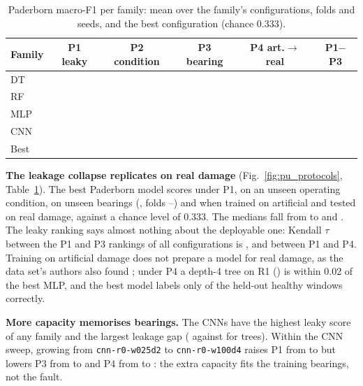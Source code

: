 \begin{table}[t]
\centering
\caption{Paderborn macro-F1 per family: mean over the family's configurations, folds and seeds, and the best
configuration (chance 0.333).}
\label{tab:pu}
\setlength{\tabcolsep}{4pt}
\begin{tabular}{lccccc}
\toprule
Family & P1 leaky & P2 condition & P3 bearing & P4 art.$\to$real & P1$-$P3 \\
\midrule
DT  & \NumPuMeanDtPOne{}  & \NumPuMeanDtPTwo{}  & \NumPuMeanDtPThree{}  & \NumPuMeanDtPFour{}  & \NumPuGapDt{} \\
RF  & \NumPuMeanRfPOne{}  & \NumPuMeanRfPTwo{}  & \NumPuMeanRfPThree{}  & \NumPuMeanRfPFour{}  & \NumPuGapRf{} \\
MLP & \NumPuMeanMlpPOne{} & \NumPuMeanMlpPTwo{} & \NumPuMeanMlpPThree{} & \NumPuMeanMlpPFour{} & \NumPuGapMlp{} \\
CNN & \NumPuMeanCnnPOne{} & \NumPuMeanCnnPTwo{} & \NumPuMeanCnnPThree{} & \NumPuMeanCnnPFour{} & \NumPuGapCnn{} \\
\midrule
Best & \NumPuPOneBest{} & \NumPuPTwoBest{} & \NumPuPThreeBest{} & \NumPuPFourBest{} & \\
\bottomrule
\end{tabular}
\end{table}

\textbf{The leakage collapse replicates on real damage} (Fig.~\ref{fig:pu_protocols}, Table~\ref{tab:pu}). The best
Paderborn model scores \NumPuPOneBest{} under P1, \NumPuPTwoBest{} on an unseen operating condition,
\NumPuPThreeBest{} on unseen bearings (\NumPuPThreeBestModel{}, folds \NumPuPThreeFoldMin{}--\NumPuPThreeFoldMax{})
and \NumPuPFourBest{} when trained on artificial and tested on real damage, against a chance level of 0.333. The
medians fall from \NumPuPOneMedian{} to \NumPuPThreeMedian{} and \NumPuPFourMedian{}. The leaky ranking says almost
nothing about the deployable one: Kendall $\tau$ between the P1 and P3 rankings of all configurations is
\NumPuTauPOnePThree{}, and \NumPuTauPOnePFour{} between P1 and P4. Training on artificial damage does not prepare a
model for real damage, as the data set's authors also found \cite{lessmeier2016condition}; under P4 a depth-4 tree on
R1 (\NumPuPFourDt{}) is within 0.02 of the best MLP, and the best model labels only \NumPuPFourHealthyAcc{} of the
held-out healthy windows correctly.

\textbf{More capacity memorises bearings.} The CNNs have the highest leaky score of any family and the largest
leakage gap (\NumPuGapCnn{} against \NumPuGapDt{} for trees). Within the CNN sweep, growing from
\texttt{cnn-r0-w025d2} to \texttt{cnn-r0-w100d4} raises P1 from \NumPuCnnSmallPOne{} to \NumPuCnnBigPOne{} but lowers
P3 from \NumPuCnnSmallPThree{} to \NumPuCnnBigPThree{} and P4 from \NumPuCnnSmallPFour{} to \NumPuCnnBigPFour{}: the
extra capacity fits the training bearings, not the fault.


